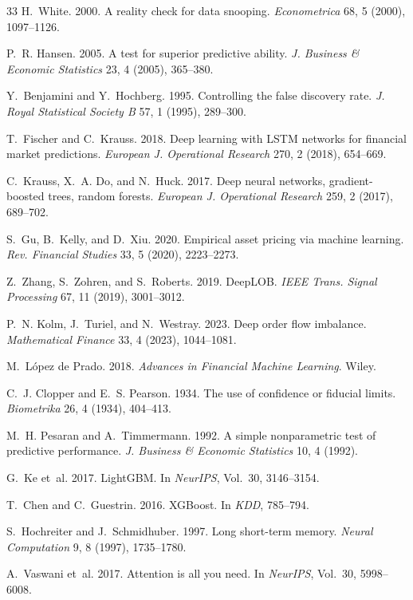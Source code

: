 \documentclass[sigconf,nonacm]{acmart}
\begin{document}
\begin{thebibliography}{33}
 H.~White. 2000. A reality check for data snooping.
\emph{Econometrica} 68, 5 (2000), 1097--1126.

 P.~R. Hansen. 2005. A test for superior predictive ability.
\emph{J. Business \& Economic Statistics} 23, 4 (2005), 365--380.

 Y.~Benjamini and Y.~Hochberg. 1995. Controlling the false
discovery rate. \emph{J. Royal Statistical Society B} 57, 1 (1995), 289--300.

 T.~Fischer and C.~Krauss. 2018. Deep learning with LSTM
networks for financial market predictions. \emph{European J. Operational
Research} 270, 2 (2018), 654--669.

 C.~Krauss, X.~A. Do, and N.~Huck. 2017. Deep neural
networks, gradient-boosted trees, random forests. \emph{European J. Operational
Research} 259, 2 (2017), 689--702.

 S.~Gu, B.~Kelly, and D.~Xiu. 2020. Empirical asset pricing via
machine learning. \emph{Rev. Financial Studies} 33, 5 (2020), 2223--2273.

 Z.~Zhang, S.~Zohren, and S.~Roberts. 2019. DeepLOB.
\emph{IEEE Trans. Signal Processing} 67, 11 (2019), 3001--3012.

 P.~N. Kolm, J.~Turiel, and N.~Westray. 2023. Deep order flow
imbalance. \emph{Mathematical Finance} 33, 4 (2023), 1044--1081.

 M.~L\'opez de Prado. 2018. \emph{Advances in Financial
Machine Learning}. Wiley.

 C.~J. Clopper and E.~S. Pearson. 1934. The use of
confidence or fiducial limits. \emph{Biometrika} 26, 4 (1934), 404--413.

 M.~H. Pesaran and A.~Timmermann. 1992. A simple nonparametric
test of predictive performance. \emph{J. Business \& Economic Statistics} 10, 4
(1992).

 G.~Ke et~al. 2017. LightGBM. In \emph{NeurIPS}, Vol.~30,
3146--3154.

 T.~Chen and C.~Guestrin. 2016. XGBoost. In \emph{KDD},
785--794.

 S.~Hochreiter and J.~Schmidhuber. 1997. Long short-term
memory. \emph{Neural Computation} 9, 8 (1997), 1735--1780.

 A.~Vaswani et~al. 2017. Attention is all you need. In
\emph{NeurIPS}, Vol.~30, 5998--6008.


\end{thebibliography}
\end{document}
